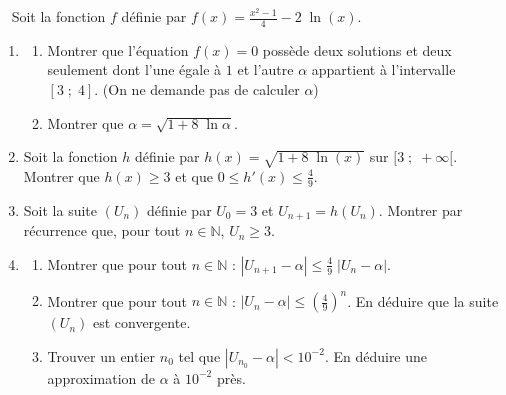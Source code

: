 \begin{exo} ~ \newline
Soit la fonction $f$ d\'efinie par $f(x) = \frac{x^2 - 1}{4} - 2 \; \ln (x)$.
\begin{enumerate}
\item \begin{enumerate}
      \item Montrer que l'\'equation $f(x) = 0$ poss\`ede deux solutions et deux seulement 
            dont l'une \'egale \`a $1$ et l'autre $\alpha$ appartient \`a l'intervalle $[3 \; ; \; 4]$. 
            (On ne demande pas de calculer $\alpha$)
      \item Montrer que $\alpha = \sqrt{1 + 8 \; \ln \alpha}$.
      \end{enumerate}
\item Soit la fonction $h$ d\'efinie par $h(x) = \sqrt{1 + 8 \; \ln (x)}$ sur $[3 \; ; \; +\infty[$.
      Montrer que $h(x) \geq 3$ et que $0 \leq h'(x) \leq \frac{4}{9}$.
\item Soit la suite $(U_n)$ d\'efinie par $U_0 = 3$ et $U_{n+1} = h(U_n)$.
      Montrer par r\'ecurrence que, pour tout $n \in \mathbb{N}$, $U_n \geq 3$.
\item \begin{enumerate}
      \item Montrer que pour tout $n \in \mathbb{N}$ : 
            $\left| U_{n+1} - \alpha \right| \leq \frac{4}{9} \; \left| U_n - \alpha \right| $.
      \item Montrer que pour tout $n \in \mathbb{N}$ : 
            $\left| U_n - \alpha \right| \leq \left( \frac{4}{9} \right)^n $.
            En d\'eduire que la suite $(U_n)$ est convergente.
      \item Trouver un entier $n_0$ tel que $\left| U_{n_0} - \alpha \right| < 10^{-2}$.
            En d\'eduire une approximation de $\alpha$ \`a $10^{-2}$ pr\`es.
      \end{enumerate}
\end{enumerate}
\end{exo}
